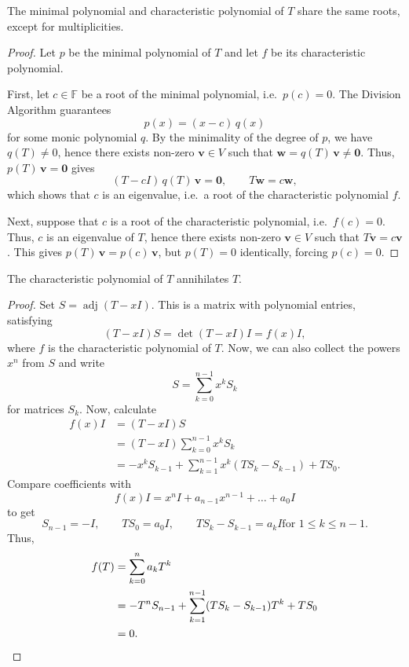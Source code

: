 \documentclass[11pt]{article}
\newcommand{\F}{\mathbb{F}}
\newcommand{\I}{I}
\renewcommand{\vec}[1]{\boldsymbol{#1}}
\newcommand{\vv}{\vec{v}}
\newcommand{\vw}{\vec{w}}
\newcommand{\adj}{\operatorname{adj}}
\theoremstyle{definition}
\theoremstyle{remark}
\numberwithin{equation}{section}
\begin{document}
    \begin{theorem}
        The minimal polynomial and characteristic polynomial of $T$ share the same
        roots, except for multiplicities.
    \end{theorem}
    \begin{proof}
        Let $p$ be the minimal polynomial of $T$ and let $f$ be its characteristic
        polynomial.

        First, let $c \in \F$ be a root of the minimal polynomial, i.e.\ $p(c) = 0$.
        The Division Algorithm guarantees \[
            p(x) = (x - c)\, q(x)
        \] for some monic polynomial $q$. By the minimality of the degree of $p$, we
        have $q(T) \neq 0$, hence there exists non-zero $\vv \in V$ such that $\vw =
        q(T)\,\vv \neq \vec{0}$. Thus, $p(T)\,\vv = \vec{0}$ gives \[
            (T - c \I)\, q(T)\, \vv = \vec{0}, \qquad T\vw = c\vw,
        \] which shows that $c$ is an eigenvalue, i.e.\ a root of the characteristic
        polynomial $f$.

        Next, suppose that $c$ is a root of the characteristic polynomial, i.e.\
        $f(c) = 0$. Thus, $c$ is an eigenvalue of $T$, hence there exists non-zero
        $\vv \in V$ such that $T\vv = c\vv$. This gives $p(T)\,\vv = p(c)\,\vv$, but
        $p(T) = 0$ identically, forcing $p(c) = 0$.
    \end{proof}

    \begin{theorem}
        The characteristic polynomial of $T$ annihilates $T$.
    \end{theorem}
    \begin{proof}
        Set $S = \adj(T - xI)$. This is a matrix with polynomial entries, satisfying
        \[
            (T - xI)S = \det(T - xI)I = f(x) I,
        \] where $f$ is the characteristic polynomial of $T$. Now, we can also
        collect the powers $x^n$ from $S$ and write \[
            S = \sum_{k = 0}^{n - 1} x^k S_k
        \] for matrices $S_k$. Now, calculate
        \begin{align*}
            f(x)I &= (T - xI)S \\
            &= (T - xI)\sum_{k = 0}^{n - 1}x^k S_k \\
            &= -x^{k}S_{k - 1} + \sum_{k = 1}^{n - 1} x^k(TS_k - S_{k - 1}) + TS_0.
        \end{align*}
        Compare coefficients with \[
            f(x)I = x^nI + a_{n - 1}x^{n - 1} + \dots + a_0I
        \] to get \[
            S_{n - 1} = -I, \qquad TS_0 = a_0I, \qquad TS_k - S_{k - 1} = a_kI \text{
            for } 1 \leq k \leq n - 1.
        \] Thus,
        \begin{align*}
            f(T) &= \sum_{k = 0}^n a_k T^k \\
            &= -T^nS_{n - 1} + \sum_{k = 1}^{n - 1} (TS_k - S_{k - 1})T^k + TS_0 \\
            &= 0. \qedhere
        \end{align*}
    \end{proof}
\end{document}
